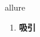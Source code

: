 
\begin{frame}
{\huge allure}
\begin{center}
\begin{enumerate}\Large
  \item \textbf{吸引}
\end{enumerate}
\end{center}
\end{frame}
